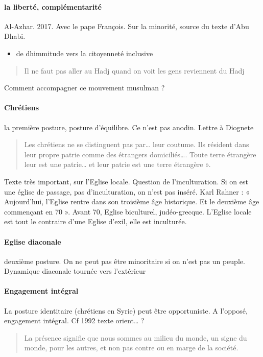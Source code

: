 \paragraph{la liberté, complémentarité} Al-Azhar. 2017. Avec le pape François. Sur la minorité, source du texte d’Abu Dhabi. 

\begin{itemize}
\item de dhimmitude vers la citoyenneté inclusive
\end{itemize}
\begin{quote}
Il ne faut pas aller au Hadj quand on voit les gens reviennent du Hadj
\end{quote}
Comment accompagner ce mouvement musulman ? 

\paragraph{Chrétiens} la première posture, posture d’équilibre. Ce n’est pas anodin. 
Lettre à Diognete
\begin{quote}
Les chrétiens ne se distinguent pas par… leur coutume. Ils résident dans leur propre patrie comme des étrangers domiciliés…. Toute terre étrangère leur est une patrie… et leur patrie est une terre étrangère ».
\end{quote}
Texte très important, sur l’Eglise locale. Question de l’inculturation. Si on est une église de passage, pas d’inculturation, on n’est pas inséré. Karl Rahner : « Aujourd’hui, l’Eglise rentre dans son troisième âge historique.  Et le deuxième âge commençant en 70 ». Avant 70, Eglise biculturel, judéo-grecque.
L’Eglise locale est tout le contraire d’une Eglise d’exil, elle est inculturée. 

\paragraph{Eglise diaconale} deuxième posture. On ne peut pas être minoritaire si on n’est pas un peuple. Dynamique diaconale tournée vers l’extérieur

\paragraph{Engagement intégral} La posture identitaire (chrétiens en Syrie) peut être opportuniste.   A l’opposé, engagement intégral. Cf 1992 texte orient… ? 
\begin{quote}
La présence signifie que nous sommes au milieu du monde, un signe du monde, pour les autres, et non pas contre ou en marge de la société.
\end{quote}

